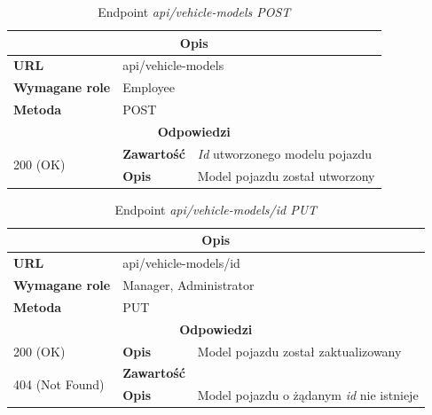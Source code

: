 \documentclass[eng,printmode,openany]{mgr}
\begin{document}
	\begin{table}[H]
		\caption{Endpoint \textit{api/vehicle-models POST}}
		\begin{tabularx}{\textwidth}{|l|l|X|}
			\hline
			\multicolumn{3}{|c|}{\textbf{\textbf{Opis}}}
			\\ \hline
			\textbf{URL}                       & \multicolumn{2}{l|}{api/vehicle-models}
			\\ \hline
			\textbf{Wymagane role}             & \multicolumn{2}{l|}{Employee}
			\\ \hline
			\textbf{Metoda}                    & \multicolumn{2}{l|}{POST}
			\\ \hline
			\multicolumn{3}{|c|}{\textbf{Odpowiedzi}}
			\\ \hline
			\multirow{2}{*}{200 (OK)} 		& \textbf{Zawartość}     & \textit{Id} utworzonego modelu pojazdu
			\\ \cline{2-3}                  & \textbf{Opis}         	& Model pojazdu został utworzony
			\\ \hline
		\end{tabularx}
	\end{table}
	
	\begin{table}[H]
		\caption{Endpoint \textit{api/vehicle-models/id PUT}}
		\begin{tabularx}{\textwidth}{|l|l|X|}
			\hline
			\multicolumn{3}{|c|}{\textbf{\textbf{Opis}}}
			\\ \hline
			\textbf{URL}                       & \multicolumn{2}{l|}{api/vehicle-models/id}
			\\ \hline
			\textbf{Wymagane role}             & \multicolumn{2}{l|}{Manager, Administrator}
			\\ \hline
			\textbf{Metoda}                    & \multicolumn{2}{l|}{PUT}
			\\ \hline
			\multicolumn{3}{|c|}{\textbf{Odpowiedzi}}
			\\ \hline
			200 (OK) 		 & \textbf{Opis}      	& Model pojazdu został zaktualizowany
			\\ \hline
			\multirow{2}{*}{404 (Not Found)} 	    & \textbf{Zawartość}     & 
			\\ \cline{2-3}                          & \textbf{Opis}          & Model pojazdu o żądanym \textit{id} nie istnieje
			\\ \hline
		\end{tabularx}
	\end{table}
	
\end{document}
